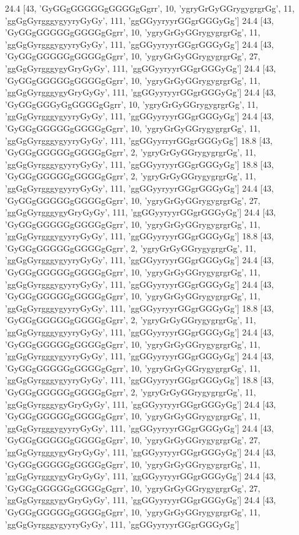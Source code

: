 24.4 [43, 'GyGGgGGGGGgGGGGgGgrr', 10, 'ygryGrGyGGrygygrgrGg', 11, 'ggGgGyrgggygyyryGyGy', 111, 'ggGGyyryyrGGgrGGGyGg']
24.4 [43, 'GyGGgGGGGGgGGGGgGgrr', 10, 'ygryGrGyGGrygygrgrGg', 11, 'ggGgGyrgggygyyryGyGy', 111, 'ggGGyyryyrGGgrGGGyGg']
24.4 [43, 'GyGGgGGGGGgGGGGgGgrr', 10, 'ygryGrGyGGrygygrgrGg', 27, 'ggGgGyrgggygyGryGyGy', 111, 'ggGGyyryyrGGgrGGGyGg']
24.4 [43, 'GyGGgGGGGGgGGGGgGgrr', 10, 'ygryGrGyGGrygygrgrGg', 11, 'ggGgGyrgggygyGryGyGy', 111, 'ggGGyyryyrGGgrGGGyGg']
24.4 [43, 'GyGGgGGGyGgGGGGgGgrr', 10, 'ygryGrGyGGrygygrgrGg', 11, 'ggGgGyrgggygyyryGyGy', 111, 'ggGGyyryyrGGgrGGGyGg']
24.4 [43, 'GyGGgGGGGGgGGGGgGgrr', 10, 'ygryGrGyGGrygygrgrGg', 11, 'ggGgGyrgggygyyryGyGy', 111, 'ggGGyyrryrGGgrGGGyGg']
18.8 [43, 'GyGGgGGGGGgGGGGgGgrr', 2, 'ygryGrGyGGrygygrgrGg', 11, 'ggGgGyrgggygyyryGyGy', 111, 'ggGGyyryyrGGgrGGGyGg']
18.8 [43, 'GyGGgGGGGGgGGGGgGgrr', 2, 'ygryGrGyGGrygygrgrGg', 11, 'ggGgGyrgggygyyryGyGy', 111, 'ggGGyyryyrGGgrGGGyGg']
24.4 [43, 'GyGGgGGGGGgGGGGgGgrr', 10, 'ygryGrGyGGrygygrgrGg', 27, 'ggGgGyrgggygyGryGyGy', 111, 'ggGGyyryyrGGgrGGGyGg']
24.4 [43, 'GyGGgGGGGGgGGGGgGgrr', 10, 'ygryGrGyGGrygygrgrGg', 11, 'ggGgGyrgggygyyryGyGy', 111, 'ggGGyyryyrGGgrGGGyGg']
18.8 [43, 'GyGGgGGGGGgGGGGgGgrr', 2, 'ygryGrGyGGrygygrgrGg', 11, 'ggGgGyrgggygyyryGyGy', 111, 'ggGGyyryyrGGgrGGGyGg']
24.4 [43, 'GyGGgGGGGGgGGGGgGgrr', 10, 'ygryGrGyGGrygygrgrGg', 11, 'ggGgGyrgggygyyryGyGy', 111, 'ggGGyyryyrGGgrGGGyGg']
24.4 [43, 'GyGGgGGGGGgGGGGgGgrr', 10, 'ygryGrGyGGrygygrgrGg', 11, 'ggGgGyrgggygyyryGyGy', 111, 'ggGGyyryyrGGgrGGGyGg']
18.8 [43, 'GyGGgGGGGGgGGGGgGgrr', 2, 'ygryGrGyGGrygygrgrGg', 11, 'ggGgGyrgggygyyryGyGy', 111, 'ggGGyyryyrGGgrGGGyGg']
24.4 [43, 'GyGGgGGGGGgGGGGgGgrr', 10, 'ygryGrGyGGrygygrgrGg', 11, 'ggGgGyrgggygyyryGyGy', 111, 'ggGGyyryyrGGgrGGGyGg']
24.4 [43, 'GyGGgGGGGGgGGGGgGgrr', 10, 'ygryGrGyGGrygygrgrGg', 11, 'ggGgGyrgggygyyryGyGy', 111, 'ggGGyyryyrGGgrGGGyGg']
18.8 [43, 'GyGGgGGGGGgGGGGgGgrr', 2, 'ygryGrGyGGrygygrgrGg', 11, 'ggGgGyrgggygyGryGyGy', 111, 'ggGGyyryyrGGgrGGGyGg']
24.4 [43, 'GyGGgGGGGGgGGGGgGgrr', 10, 'ygryGrGyGGrygygrgrGg', 11, 'ggGgGyrgggygyyryGyGy', 111, 'ggGGyyryyrGGgrGGGyGg']
24.4 [43, 'GyGGgGGGGGgGGGGgGgrr', 10, 'ygryGrGyGGrygygrgrGg', 27, 'ggGgGyrgggygyGryGyGy', 111, 'ggGGyyryyrGGgrGGGyGg']
24.4 [43, 'GyGGgGGGGGgGGGGgGgrr', 10, 'ygryGrGyGGrygygrgrGg', 11, 'ggGgGyrgggygyGryGyGy', 111, 'ggGGyyryyrGGgrGGGyGg']
24.4 [43, 'GyGGgGGGGGgGGGGgGgrr', 10, 'ygryGrGyGGrygygrgrGg', 27, 'ggGgGyrgggygyGryGyGy', 111, 'ggGGyyryyrGGgrGGGyGg']
24.4 [43, 'GyGGgGGGGGgGGGGgGgrr', 10, 'ygryGrGyGGrygygrgrGg', 11, 'ggGgGyrgggygyyryGyGy', 111, 'ggGGyyryyrGGgrGGGyGg']
